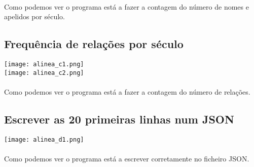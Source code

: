 \documentclass[11pt,a4paper]{report}
\begin{document}
    \paragraph{}
    Como podemos ver o programa está a fazer a contagem do número de nomes e apelidos por século.

    \subsection{Frequência de relações por século}
    \texttt{[image: alinea\_c1.png]} \\
    \texttt{[image: alinea\_c2.png]}

    \paragraph{}
    Como podemos ver o programa está a fazer a contagem do número de relações.

    \subsection{Escrever as 20 primeiras linhas num JSON}
    \texttt{[image: alinea\_d1.png]} \\
    \paragraph{}
    Como podemos ver o programa está a escrever corretamente no ficheiro JSON.
    
\end{document}
